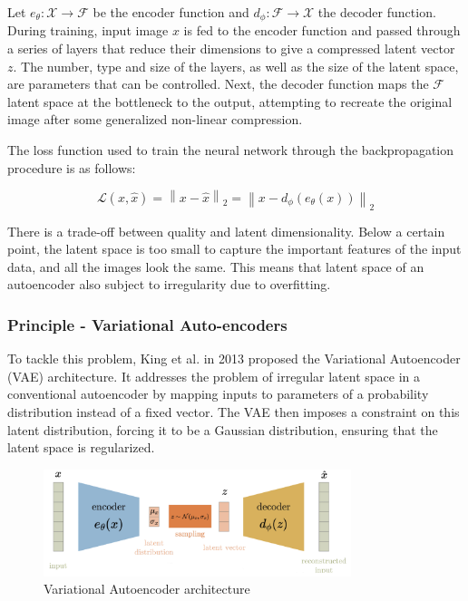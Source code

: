 \documentclass{article}
\begin{document}
Let $e_{\theta}:\mathcal{X}\to \mathcal{F}$ be the encoder function and $d_{\phi}:\mathcal{F}\to \mathcal{X}$ the decoder function. 
During training, input image $x$ is fed to the encoder function and passed through a series of layers that reduce their dimensions to give a compressed latent vector $z$. 
The number, type and size of the layers, as well as the size of the latent space, are parameters that can be controlled. 
Next, the decoder function maps the $\mathcal{F}$ latent space at the bottleneck to the output, attempting to recreate the original image after some generalized non-linear compression. 

The loss function used to train the neural network through the backpropagation procedure is as follows: 

\[\mathcal{L}(x,\hat{x})=\left\| x-\hat{x}\right\|_{2}=\left\| x-d_{\phi}(e_{\theta}(x)) \right\|_{2}\]

There is a trade-off between quality and latent dimensionality. Below a certain point, the latent space is too small to capture the important features of the input data, and all the images look the same.
This means that latent space of an autoencoder also subject to irregularity due to overfitting. 

\subsubsection*{Principle - Variational Auto-encoders}
To tackle this problem, King et al. in 2013 proposed the Variational Autoencoder (VAE) architecture. It addresses the problem of irregular latent space in a conventional autoencoder by mapping inputs to parameters of a probability distribution instead of a fixed vector.
The VAE then imposes a constraint on this latent distribution, forcing it to be a Gaussian distribution, ensuring that the latent space is regularized.

\begin{figure}[H]
    \centering
    \includegraphics[width=0.8\textwidth]{images/vae.png}
    \caption{Variational Autoencoder architecture}
\end{figure}
\end{document}

